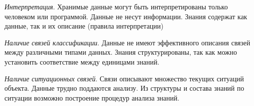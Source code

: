 \begin{SCn}
{	\begin{scnitemize}
		\item \textit{Интерпретация}. Хранимые данные могут быть интерпретированы только человеком или программой. Данные не несут информации. Знания содержат как данные, так и их описание (правила интерпретации)
		\item \textit{Наличие связей классификации}. Данные не имеют эффективного описания связей между различными типами данных. Знания структурированы, так как можно установить соответствие между единицами знаний.
		\item \textit{Наличие ситуационных связей}. Связи описывают множество текущих ситуаций объекта. Данные трудно поддаются анализу. Из структуры и состава знаний по ситуации возможно построение процедур анализа знаний.
	\end{scnitemize}
}

    
    

\end{SCn}
